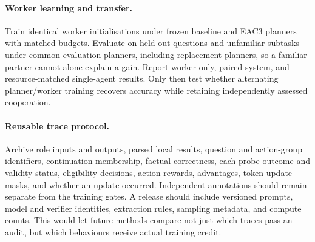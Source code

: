 \documentclass[11pt]{article}
\begin{document}
\paragraph{Worker learning and transfer.}
Train identical worker initialisations under frozen baseline and EAC3 planners with matched budgets. Evaluate on held-out questions and unfamiliar subtasks under common evaluation planners, including replacement planners, so a familiar partner cannot alone explain a gain. Report worker-only, paired-system, and resource-matched single-agent results. Only then test whether alternating planner/worker training recovers accuracy while retaining independently assessed cooperation.

\paragraph{Reusable trace protocol.}
Archive role inputs and outputs, parsed local results, question and action-group identifiers, continuation membership, factual correctness, each probe outcome and validity status, eligibility decisions, action rewards, advantages, token-update masks, and whether an update occurred. Independent annotations should remain separate from the training gates. A release should include versioned prompts, model and verifier identities, extraction rules, sampling metadata, and compute counts. This would let future methods compare not just which traces pass an audit, but which behaviours receive actual training credit.
\end{document}
